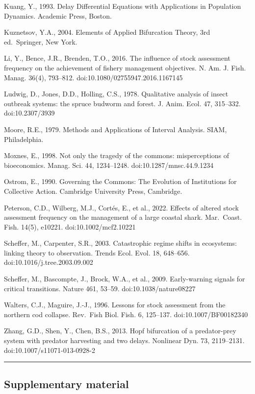 \documentclass[11pt]{article}
\begin{document}
Kuang, Y., 1993. Delay Differential Equations with Applications in
Population Dynamics. Academic Press, Boston.

Kuznetsov, Y.A., 2004. Elements of Applied Bifurcation Theory, 3rd
ed.~Springer, New York.

Li, Y., Bence, J.R., Brenden, T.O., 2016. The influence of stock
assessment frequency on the achievement of fishery management
objectives. N. Am. J. Fish. Manag. 36(4), 793--812.
doi:10.1080/02755947.2016.1167145

Ludwig, D., Jones, D.D., Holling, C.S., 1978. Qualitative analysis of
insect outbreak systems: the spruce budworm and forest. J. Anim. Ecol.
47, 315--332. doi:10.2307/3939

Moore, R.E., 1979. Methods and Applications of Interval Analysis. SIAM,
Philadelphia.

Moxnes, E., 1998. Not only the tragedy of the commons: misperceptions of
bioeconomics. Manag. Sci. 44, 1234--1248. doi:10.1287/mnsc.44.9.1234

Ostrom, E., 1990. Governing the Commons: The Evolution of Institutions
for Collective Action. Cambridge University Press, Cambridge.

Peterson, C.D., Wilberg, M.J., Cort\'es, E., et al., 2022. Effects of
altered stock assessment frequency on the management of a large coastal
shark. Mar.~Coast. Fish. 14(5), e10221. doi:10.1002/mcf2.10221

Scheffer, M., Carpenter, S.R., 2003. Catastrophic regime shifts in
ecosystems: linking theory to observation. Trends Ecol. Evol. 18,
648--656. doi:10.1016/j.tree.2003.09.002

Scheffer, M., Bascompte, J., Brock, W.A., et al., 2009. Early-warning
signals for critical transitions. Nature 461, 53--59.
doi:10.1038/nature08227

Walters, C.J., Maguire, J.-J., 1996. Lessons for stock assessment from
the northern cod collapse. Rev.~Fish Biol. Fish. 6, 125--137.
doi:10.1007/BF00182340

Zhang, G.D., Shen, Y., Chen, B.S., 2013. Hopf bifurcation of a
predator-prey system with predator harvesting and two delays. Nonlinear
Dyn. 73, 2119--2131. doi:10.1007/s11071-013-0928-2

\begin{center}\rule{0.5\linewidth}{0.5pt}\end{center}

\subsection{Supplementary material}\label{supplementary-material}
\end{document}
